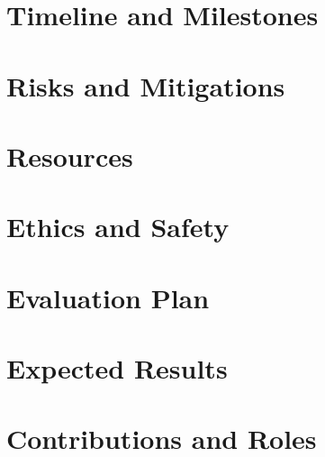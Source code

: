 \documentclass[conference]{IEEEtran}
\begin{document}
\section{Timeline and Milestones}

\section{Risks and Mitigations}

\section{Resources}

\section{Ethics and Safety}

\section{Evaluation Plan}

\section{Expected Results}

\section{Contributions and Roles}


\end{document}

